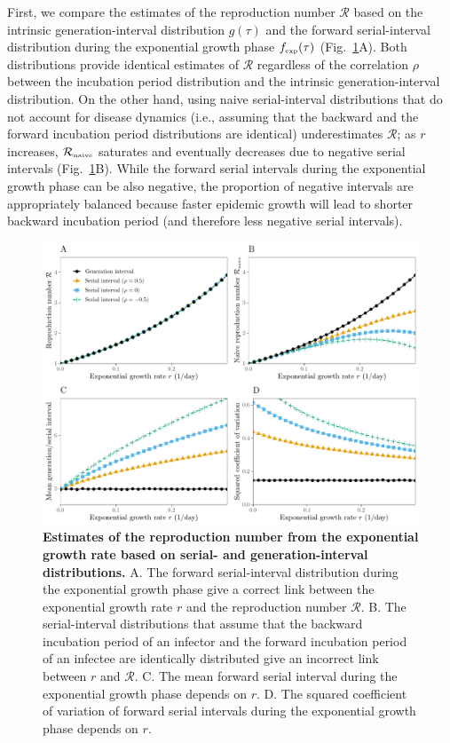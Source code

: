 \documentclass[12pt]{article}
\newcommand{\fref}[1]{Fig.~\ref{fig:#1}}
\begin{document}
First, we compare the estimates of the reproduction number $\mathcal R$ based on the intrinsic generation-interval distribution $g(\tau)$ and the forward serial-interval distribution during the exponential growth phase $f_{\textrm{\tiny exp}}(\tau)$ (\fref{rR}A).
Both distributions provide identical estimates of $\mathcal R$ regardless of the correlation $\rho$ between the incubation period distribution and the intrinsic generation-interval distribution.
On the other hand, using naive serial-interval distributions that do not account for disease dynamics (i.e., assuming that the backward and the forward incubation period distributions are identical) underestimates $\mathcal R$;
as $r$ increases, ${\mathcal R}_{\textrm{\tiny naive}}$ saturates and eventually decreases due to negative serial intervals (\fref{rR}B).
While the forward serial intervals during the exponential growth phase can be also negative, the proportion of negative intervals are appropriately balanced because faster epidemic growth will lead to shorter backward incubation period (and therefore less negative serial intervals).

\begin{figure}[!th]
\includegraphics[width=\textwidth]{rR.pdf}
\caption{
\textbf{Estimates of the reproduction number from the exponential growth rate based on serial- and generation-interval distributions.}
A. The forward serial-interval distribution during the exponential growth phase give a correct link between the exponential growth rate $r$ and the reproduction number $\mathcal R$.
B. The serial-interval distributions that assume that the backward incubation period of an infector and the forward incubation period of an infectee are identically distributed give an incorrect link between $r$ and $\mathcal R$.
C. The mean forward serial interval during the exponential growth phase depends on $r$.
D. The squared coefficient of variation of forward serial intervals during the exponential growth phase depends on $r$.
}
\label{fig:rR}
\end{figure}
\end{document}
